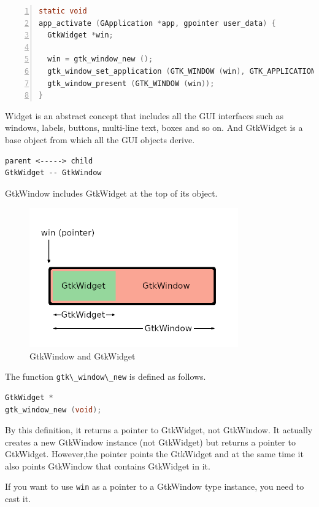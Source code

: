 \begin{lstlisting}[language=C, numbers=left]
static void
app_activate (GApplication *app, gpointer user_data) {
  GtkWidget *win;

  win = gtk_window_new ();
  gtk_window_set_application (GTK_WINDOW (win), GTK_APPLICATION (app));
  gtk_window_present (GTK_WINDOW (win));
}
\end{lstlisting}

Widget is an abstract concept that includes all the GUI interfaces such
as windows, labels, buttons, multi-line text, boxes and so on. And
GtkWidget is a base object from which all the GUI objects derive.

\begin{lstlisting}
parent <-----> child
GtkWidget -- GtkWindow
\end{lstlisting}

GtkWindow includes GtkWidget at the top of its object.

\begin{figure}
\centering
\includegraphics[width=9cm,height=6cm]{../image/window_widget.png}
\caption{GtkWindow and GtkWidget}
\end{figure}

The function \passthrough{\lstinline!gtk\_window\_new!} is defined as
follows.

\begin{lstlisting}[language=C]
GtkWidget *
gtk_window_new (void);
\end{lstlisting}

By this definition, it returns a pointer to GtkWidget, not GtkWindow. It
actually creates a new GtkWindow instance (not GtkWidget) but returns a
pointer to GtkWidget. However,the pointer points the GtkWidget and at
the same time it also points GtkWindow that contains GtkWidget in it.

If you want to use \passthrough{\lstinline!win!} as a pointer to a
GtkWindow type instance, you need to cast it.

